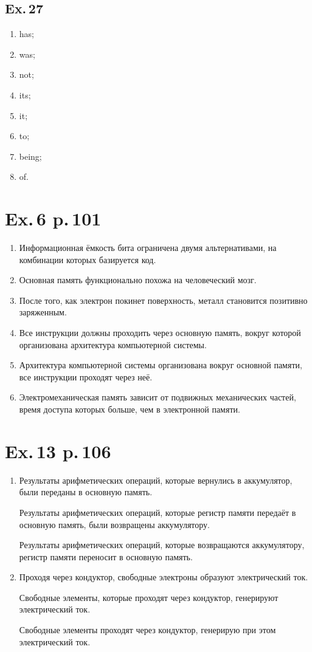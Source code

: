\documentclass[a4paper,10pt,notitlepage,pdftex,headsepline]{scrartcl}
\begin{document}
\subsection{Ex.\,27}
\begin{enumerate}
\item has;
\item was;
\item not;
\item its;
\item it;
\item to;
\item being;
\item of.
\end{enumerate}
\section{Ex.\,6 p.\,101}
\begin{enumerate}
\item Информационная ёмкость бита ограничена двумя альтернативами, на комбинации которых базируется код.
\item Основная память функционально похожа на человеческий мозг.
\item После того, как электрон покинет поверхность, металл становится позитивно заряженным.
\item Все инструкции должны проходить через основную память, вокруг которой организована архитектура компьютерной системы.
\item Архитектура компьютерной системы организована вокруг основной памяти, все инструкции проходят через неё.
\item Электромеханическая память зависит от подвижных механических частей, время доступа которых больше, чем в электронной памяти.
\end{enumerate}
\section{Ex.\,13 p.\,106}
\begin{enumerate}
\item Результаты арифметических операций, которые вернулись в аккумулятор, были переданы в основную память.

Результаты арифметических операций, которые регистр памяти передаёт в основную память, были возвращены аккумулятору.

Результаты арифметических операций, которые возвращаются аккумулятору, регистр памяти переносит в основную память.
\item Проходя через кондуктор, свободные электроны образуют электрический ток.

Свободные элементы, которые проходят через кондуктор, генерируют электрический ток.

Свободные элементы проходят через кондуктор, генерирую при этом электрический ток.
\end{enumerate}
\end{document}
